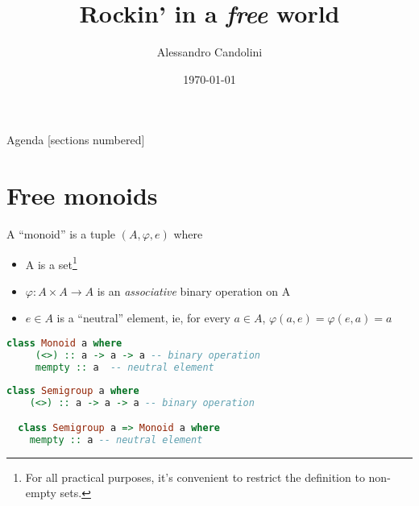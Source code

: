 \documentclass[10pt]{beamer}
\title{Rockin' in a \emph{free} world}
\date{\today}
\author[Alessandro Candolini]{Alessandro Candolini}
\begin{document}
\maketitle

\begin{frame}{Agenda}
  [sections numbered]
  \tableofcontents[hideallsubsections]
\end{frame}


\section{Free monoids}








\begin{frame}
  \begin{definition}[monoid]

    A ``monoid'' is a tuple $(A, \varphi, e)$ where
    \begin{itemize}
      \item A is a set\footnote{For all practical purposes, it's convenient to restrict the definition to non-empty sets.}
      \item $\varphi : A \times A \rightarrow A$ is an \emph{associative} binary operation on A
      \item $e \in A$ is a ``neutral'' element, ie, for every $a \in A $, $\varphi(a, e) = \varphi(e,a) = a$
    \end{itemize}

  \end{definition}

\end{frame}

\begin{frame}[fragile]
  \begin{lstlisting}[language=haskell]
  class Monoid a where
     (<>) :: a -> a -> a -- binary operation
     mempty :: a  -- neutral element
  \end{lstlisting}
\end{frame}


\begin{frame}[fragile]
\begin{lstlisting}[language=haskell]
  class Semigroup a where
    (<>) :: a -> a -> a -- binary operation

  class Semigroup a => Monoid a where
    mempty :: a -- neutral element
\end{lstlisting}
\end{frame}
\end{document}

